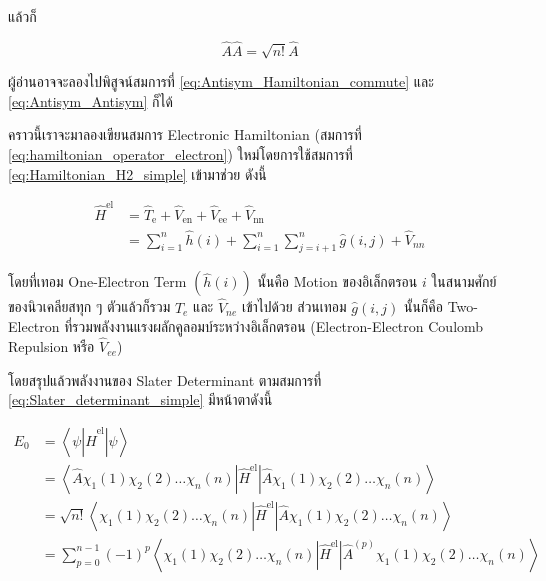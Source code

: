 \noindent แล้วก็

\begin{equation}
  \label{eq:Antisym_Antisym}
  \hat{A} \hat{A} = \sqrt{n !} \hat{A}
\end{equation}

\noindent ผู้อ่านอาจจะลองไปพิสูจน์สมการที่ \eqref{eq:Antisym_Hamiltonian_commute} และ \eqref{eq:Antisym_Antisym} ก็ได้

คราวนี้เราจะมาลองเขียนสมการ Electronic Hamiltonian (สมการที่ \eqref{eq:hamiltonian_operator_electron})
ใหม่โดยการใช้สมการที่ \eqref{eq:Hamiltonian_H2_simple} เข้ามาช่วย ดังนี้

\begin{equation}
  \begin{aligned}
    \hat{H}^{\text{el}}
     & = \hat{T}_{\text{e}}
    + \hat{V}_{\text{en}}
    + \hat{V}_{\text{ee}}
    + \hat{V}_{\text{nn}}          \\
     & = \sum_{i=1}^{n} \hat{h}(i)
    + \sum_{i=1}^{n} \sum_{j=i+1}^{n} \hat{g}(i,j) + \hat{V}_{nn}
  \end{aligned}
\end{equation}

\noindent โดยที่เทอม One-Electron Term $(\hat{h}(i))$ นั้นคือ Motion ของอิเล็กตรอน $i$ ในสนามศักย์ของนิวเคลียสทุก ๆ
ตัวแล้วก็รวม $\hat{T}_e$ และ $\hat{V}_{n e}$ เข้าไปด้วย ส่วนเทอม $\hat{g}(i, j)$ นั้นก็คือ Two-Electron
ที่รวมพลังงานแรงผลักคูลอมบ์ระหว่างอิเล็กตรอน (Electron-Electron Coulomb Repulsion หรือ $\hat{V}_{e e}$)

โดยสรุปแล้วพลังงานของ Slater Determinant ตามสมการที่ \eqref{eq:Slater_determinant_simple} มีหน้าตาดังนี้

\begin{equation}
  \label{eq:energy_Slater_determinant}
  \begin{aligned}
    E_0
     & = \left\langle\psi
    \left|\hat{H}^{\mathrm{el}}\right| \psi\right\rangle                       \\
     & = \left\langle\hat{A} \chi_1(1) \chi_2(2) \dots \chi_n(n)
    \left|\hat{H}^{\mathrm{el}}\right|
    \hat{A} \chi_1(1) \chi_2(2) \dots \chi_n(n)\right\rangle                   \\
     & = \sqrt{n !}\left\langle\chi_1(1) \chi_2(2) \dots \chi_n(n)
    \left|\hat{H}^{\mathrm{el}}\right|
    \hat{A} \chi_1(1) \chi_2(2) \dots \chi_n(n)\right\rangle                   \\
     & = \sum_{p=0}^{n-1}(-1)^p\left\langle\chi_1(1) \chi_2(2) \dots \chi_n(n)
    \left|\hat{H}^{\mathrm{el}}\right|
    \hat{A}^{(p)} \chi_1(1) \chi_2(2) \dots \chi_n(n)\right\rangle
  \end{aligned}
\end{equation}

